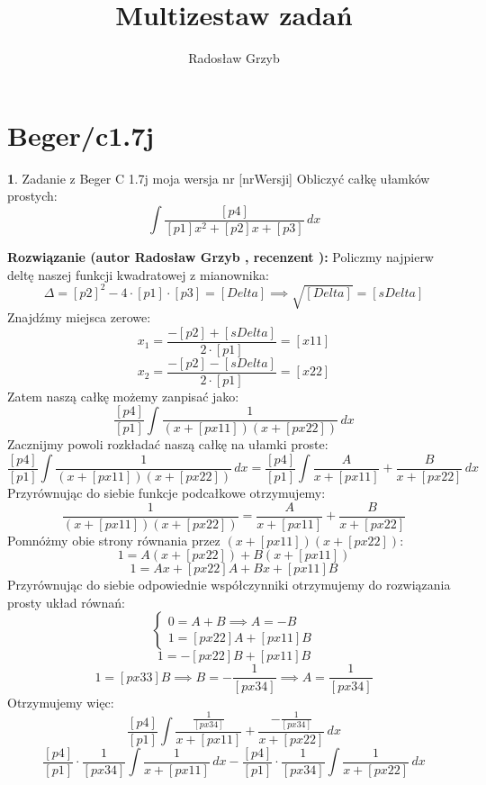 \documentclass[12pt, a4paper]{article}
\title{Multizestaw zadań}
\author{Radosław Grzyb}
\date{}
\theoremstyle{definition} %
\newtheorem{zad}{}
\newcommand{\kategoria}[1]{\section{#1}} %
\newcommand{\zadStart}[1]{\begin{zad}#1\newline} %
\newcommand{\zadStop}{\end{zad}}   %
\newcommand{\rozwStart}[2]{\noindent \textbf{Rozwiązanie (autor #1 , recenzent #2): }\newline} %
\begin{document}
\maketitle
\kategoria{Beger/c1.7j}
\zadStart{Zadanie z Beger C 1.7j moja wersja nr [nrWersji]}
Obliczyć całkę ułamków prostych:
$$\int \frac{[p4]}{[p1]x^2+[p2]x+[p3]} \,dx$$
\zadStop
\rozwStart{Radosław Grzyb}{}
Policzmy najpierw deltę naszej funkcji kwadratowej z mianownika:
$$\Delta=[p2]^2-4\cdot[p1]\cdot[p3]=[Delta]\implies\sqrt{[Delta]}=[sDelta]$$
Znajdźmy miejsca zerowe:
$$x_{1}=\frac{-[p2]+[sDelta]}{2\cdot[p1]}=[x11]$$
$$x_{2}=\frac{-[p2]-[sDelta]}{2\cdot[p1]}=[x22]$$
Zatem naszą całkę możemy zanpisać jako:
$$\frac{[p4]}{[p1]}\int \frac{1}{(x+[px11])(x+[px22])} \,dx$$
Zacznijmy powoli rozkładać naszą całkę na ułamki proste:
$$\frac{[p4]}{[p1]}\int \frac{1}{(x+[px11])(x+[px22])} \,dx=\frac{[p4]}{[p1]}\int \frac{A}{x+[px11]}+\frac{B}{x+[px22]} \,dx$$
Przyrównując do siebie funkcje podcałkowe otrzymujemy:
$$\frac{1}{(x+[px11])(x+[px22])}=\frac{A}{x+[px11]}+\frac{B}{x+[px22]}$$
Pomnóżmy obie strony równania przez $(x+[px11])(x+[px22])$:
$$1=A(x+[px22])+B(x+[px11])$$
$$1=Ax+[px22]A+Bx+[px11]B$$
Przyrównując do siebie odpowiednie współczynniki otrzymujemy do rozwiązania prosty układ równań:
$$\begin{cases} 0=A+B \implies A=-B  \\ 1=[px22]A+[px11]B \end{cases}$$
$$1=-[px22]B +[px11]B$$
$$1=[px33]B\implies B=-\frac{1}{[px34]}\implies A=\frac{1}{[px34]}$$
Otrzymujemy więc:
$$\frac{[p4]}{[p1]}\int \frac{\frac{1}{[px34]}}{x+[px11]}+\frac{-\frac{1}{[px34]}}{x+[px22]} \,dx$$
$$\frac{[p4]}{[p1]}\cdot\frac{1}{[px34]}\int \frac{1}{x+[px11]} \,dx-\frac{[p4]}{[p1]}\cdot\frac{1}{[px34]}\int \frac{1}{x+[px22]} \,dx$$\\
\end{document}
